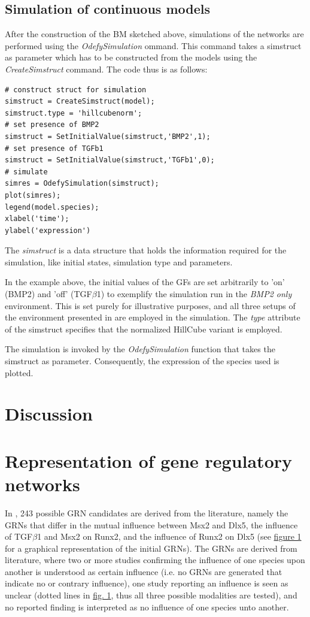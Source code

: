 \documentclass[11pt]{article}
\begin{document}
\subsection{Simulation of continuous models} \label{ssec:simulationCM}
After the construction of the BM sketched above, simulations of the networks are performed using the \textit{OdefySimulation} ommand. This command takes a simstruct as parameter which has to be constructed from the models using the \textit{CreateSimstruct} command. The code thus is as follows:
\begin{lstlisting}
# construct struct for simulation
simstruct = CreateSimstruct(model);
simstruct.type = 'hillcubenorm';
# set presence of BMP2
simstruct = SetInitialValue(simstruct,'BMP2',1);
# set presence of TGFb1
simstruct = SetInitialValue(simstruct,'TGFb1',0);
# simulate
simres = OdefySimulation(simstruct);
plot(simres);
legend(model.species);
xlabel('time');
ylabel('expression')
\end{lstlisting}

The \textit{simstruct} is a data structure that holds the information required for the simulation, like initial states, simulation type and parameters.

In the example above, the initial values of the GFs are set arbitrarily to 'on' (BMP2) and 'off' (TGF$\beta$1) to exemplify the simulation run in the \textit{BMP2 only} environment. This is set purely for illustrative purposes, and all three
setups of the environment presented in \cite{Kirkham} are employed in the simulation. The \textit{type} attribute of the simstruct specifies that the normalized HillCube variant is employed.

The simulation is invoked by the \textit{OdefySimulation} function that takes the simstruct as parameter. Consequently, the expression of the species used is plotted.

\section{Discussion} \label{sec:Discussion}


\section{Representation of gene regulatory networks}
In \cite{Kirkham}, 243 possible GRN candidates are derived from the literature, namely the GRNs that differ in the mutual influence between Msx2 and Dlx5, the influence of TGF$\beta$1 and Msx2 on Runx2, and the influence of Runx2 on Dlx5
(see \hyperref[regulatory_network]{figure 1} for a graphical representation of the initial GRNs).
The GRNs are derived from literature, where two or more studies confirming the influence of one species upon another is understood as certain influence (i.e. no GRNs are generated that indicate no or contrary influence), one study reporting an influence is seen as unclear (dotted lines in \hyperref[regulatory_network]{fig. 1}, thus all three possible modalities are tested), and no reported finding is interpreted as no influence of one species unto another.
\end{document}
